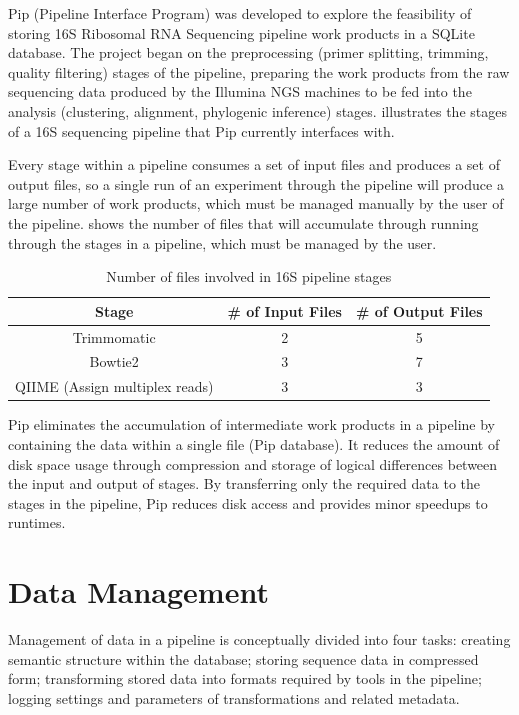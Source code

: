 \documentclass[12pt]{article}
\begin{document}
	Pip (Pipeline Interface Program) was developed to explore the feasibility of 
	storing 16S Ribosomal RNA Sequencing pipeline work products in a SQLite database.
	The project began on the preprocessing (primer splitting, trimming, quality filtering) 
	stages of the pipeline, preparing the work products from the raw sequencing 
	data produced by the Illumina NGS machines to be fed into the analysis (clustering, alignment, phylogenic inference) 
	stages.  illustrates the stages of a 16S sequencing pipeline that Pip currently 
	interfaces with.
	
	Every stage within a pipeline consumes a set of input files and produces a set 
	of output files, so a single run of an experiment through the pipeline will produce
	a large number of work products, which must be managed manually by the user of 
	the pipeline.  shows the number of files that will
	accumulate through running through the stages in a pipeline, which must be managed
	by the user.
	
	\begin{table}[h!]
		\centering
		\begin{tabular}{ccc}
		\toprule
		Stage & {\# of Input Files} & {\# of Output Files}\\
		\midrule
		Trimmomatic & 2 & 5 \\
		Bowtie2 & 3 & 7\\
		QIIME (Assign multiplex reads) & 3 & 3\\
		\bottomrule
		\end{tabular}
		\caption{Number of files involved in 16S pipeline stages}
		\label{tab:stages_files}
	\end{table}
	
	Pip eliminates the accumulation of intermediate work products in a pipeline by
	containing the data within a single file (Pip database). It reduces the amount 
	of disk space usage through compression and storage of logical differences between
	the input and output of stages. By transferring only the required data to the 
	stages in the pipeline, Pip reduces disk access and provides minor speedups to 
	runtimes.
	
	\section{Data Management} %
	\label{sec:data_management}
	Management of data in a pipeline is conceptually divided into four tasks: 
	creating semantic structure within the database; storing sequence data in compressed form;
	transforming stored data into formats required by tools in the pipeline; logging
	settings and parameters of transformations and related metadata.
	
\end{document}

